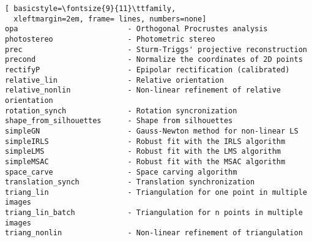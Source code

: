 \begin{adjustbox}{width=\textwidth,keepaspectratio}
\begin{lstlisting}[ basicstyle=\fontsize{9}{11}\ttfamily,
  xleftmargin=2em, frame= lines, numbers=none]
opa                         - Orthogonal Procrustes analysis
photostereo                 - Photometric stereo
prec                        - Sturm-Triggs' projective reconstruction  
precond                     - Normalize the coordinates of 2D points
rectifyP                    - Epipolar rectification (calibrated)
relative_lin                - Relative orientation
relative_nonlin             - Non-linear refinement of relative orientation
rotation_synch              - Rotation syncronization
shape_from_silhouettes      - Shape from silhouettes
simpleGN                    - Gauss-Newton method for non-linear LS
simpleIRLS                  - Robust fit with the IRLS algorithm
simpleLMS                   - Robust fit with the LMS algorithm
simpleMSAC                  - Robust fit with the MSAC algorithm   
space_carve                 - Space carving algorithm
translation_synch           - Translation synchronization
triang_lin                  - Triangulation for one point in multiple images
triang_lin_batch            - Triangulation for n points in multiple images
triang_nonlin               - Non-linear refinement of triangulation
\end{lstlisting}
\end{adjustbox}



